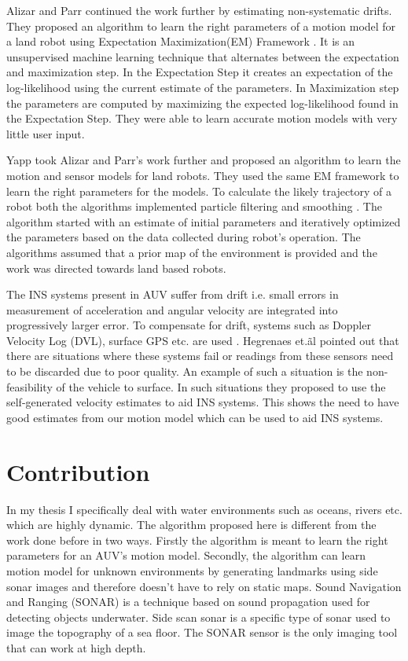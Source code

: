 \documentclass[12pt]{dalcsthesis}
\begin{document}
Alizar and Parr \cite{Eliazar2004} continued the work further by estimating non-systematic drifts.  They proposed an algorithm to learn the right parameters of a motion model for a land robot using Expectation Maximization(EM) Framework \cite{dempster1977maximum}. It is an unsupervised machine learning technique that alternates between the expectation and maximization step. In the Expectation Step it creates an expectation of the log-likelihood using the current estimate of the parameters. In Maximization step the parameters are computed by maximizing the expected log-likelihood found in the Expectation Step. They were able to learn accurate motion models with very little user input.

Yapp \cite{Yap2008} took Alizar and Parr's \cite{Eliazar2004} work further and proposed an algorithm to learn the motion and sensor models for land robots. They used the same EM framework to learn the right parameters for the models. To calculate the likely trajectory of a robot both the algorithms implemented particle filtering \cite{ristic2004beyond} \cite{chen2003bayesian} and smoothing \cite{doucet2000monte}.  The algorithm started with an estimate of initial parameters and iteratively optimized the parameters based on the data collected during robot's operation. The algorithms assumed that a prior map of the environment is provided and the work was directed towards land based robots.

The INS systems present in AUV suffer from drift i.e. small errors in measurement of acceleration and angular velocity are integrated into progressively larger error. To compensate for drift, systems such as Doppler Velocity Log (DVL), surface GPS etc. are used \cite{Lammas2004} \cite{leonard1998autonomous}. Hegrenaes et.\~al \cite{Hegrenæs2008} pointed out that there are situations where these systems fail or readings from these sensors need to be discarded due to poor quality.  An example of such a situation is the non-feasibility of the vehicle to surface.  In such situations they proposed to use the self-generated velocity estimates to aid INS systems. This shows the need to have good estimates from our motion model which can be used to aid INS systems.

\section{Contribution}

In my thesis I specifically deal with water environments such as oceans, rivers etc. which are highly dynamic.  The algorithm proposed here is different from the work done before in two ways. Firstly the algorithm is meant to learn the right parameters for an AUV's motion model. Secondly, the algorithm can learn motion model for unknown environments by generating landmarks using side sonar images and therefore doesn't have to rely on static maps. Sound Navigation and Ranging (SONAR) is a technique based on sound propagation used for detecting objects underwater. Side scan sonar is a specific type of sonar used to image the topography of a sea floor.  The SONAR sensor is the only imaging tool that can work at high depth. 
\end{document}
